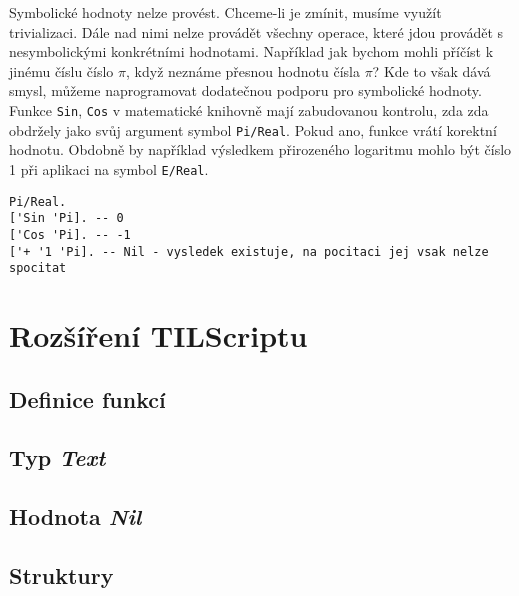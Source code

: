 Symbolické hodnoty nelze provést. Chceme-li je zmínit, musíme využít trivializaci. Dále nad nimi
nelze provádět všechny operace, které jdou provádět s nesymbolickými konkrétními hodnotami.
Například jak bychom mohli příčíst k jinému číslu číslo $\pi$, když neznáme přesnou hodnotu čísla
$\pi$? Kde to však dává smysl, můžeme naprogramovat dodatečnou podporu pro symbolické hodnoty.
Funkce \lstinline{Sin}, \lstinline{Cos} v matematické knihovně mají zabudovanou kontrolu, zda
zda obdržely jako svůj argument symbol \lstinline{Pi/Real}. Pokud ano, funkce vrátí korektní
hodnotu. Obdobně by například výsledkem přirozeného logaritmu mohlo být číslo 1 při aplikaci
na symbol \lstinline{E/Real}.

\begin{lstlisting}[caption={Příklad využití symbolických hodnot}]
Pi/Real.
['Sin 'Pi]. -- 0
['Cos 'Pi]. -- -1
['+ '1 'Pi]. -- Nil - vysledek existuje, na pocitaci jej vsak nelze spocitat
\end{lstlisting}

\section{Rozšíření TILScriptu}

\subsection{Definice funkcí} \label{fn-definition}

\subsection{Typ \textit{Text}} \label{text-type}

\subsection{Hodnota \textit{Nil}} \label{nil-value}

\subsection{Struktury} \label{structs}

\endinput
